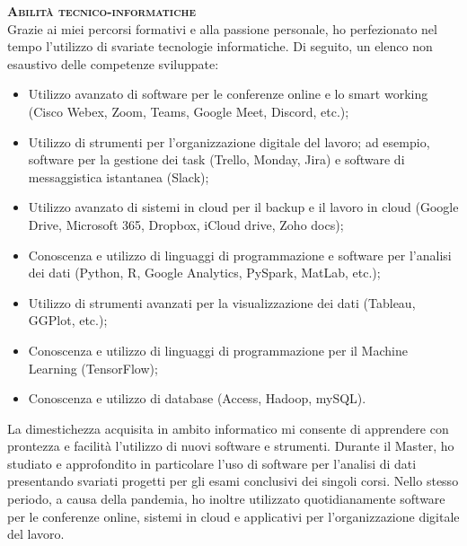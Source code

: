 \newpage

\textbf{\textsc{Abilità tecnico-informatiche}} \\
Grazie ai miei percorsi formativi e alla passione personale, ho perfezionato nel tempo l’utilizzo di svariate tecnologie informatiche. Di seguito, un elenco non esaustivo delle competenze sviluppate: 
\begin{itemize}
	\item Utilizzo avanzato di software per le conferenze online e lo smart working (Cisco Webex, Zoom, Teams, Google Meet, Discord, etc.);
	\item Utilizzo di strumenti per l’organizzazione digitale del lavoro; ad esempio, software per la gestione dei task (Trello, Monday, Jira) e software di messaggistica istantanea (Slack);
	\item Utilizzo avanzato di sistemi in cloud per il backup e il lavoro in cloud (Google Drive, Microsoft 365, Dropbox, iCloud drive, Zoho docs);
	\item Conoscenza e utilizzo di linguaggi di programmazione e software per l’analisi dei dati (Python, R, Google Analytics, PySpark, MatLab, etc.);
	\item Utilizzo di strumenti avanzati per la visualizzazione dei dati (Tableau, GGPlot, etc.);
	\item Conoscenza e utilizzo di linguaggi di programmazione per il Machine Learning (TensorFlow);
	\item Conoscenza e utilizzo di database (Access, Hadoop, mySQL).
\end{itemize}
La dimestichezza acquisita in ambito informatico mi consente di apprendere con prontezza e facilità l’utilizzo di nuovi software e strumenti.
Durante il Master, ho studiato e approfondito in particolare l’uso di software per l’analisi di dati presentando svariati progetti per gli esami conclusivi dei singoli corsi.
Nello stesso periodo, a causa della pandemia, ho inoltre utilizzato quotidianamente software per le conferenze online, sistemi in cloud e applicativi per l’organizzazione digitale del lavoro.

